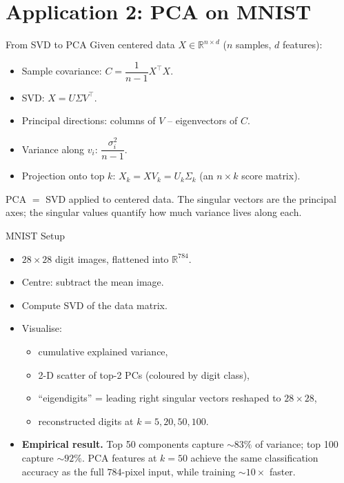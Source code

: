 \documentclass[10pt,aspectratio=169]{beamer}
\newcommand{\R}{\mathbb{R}}
\begin{document}
\section{Application 2: PCA on MNIST}

\begin{frame}{From SVD to PCA}
  Given centered data $X \in \R^{n \times d}$ ($n$ samples, $d$ features):
  \begin{itemize}
    \item Sample covariance: $C = \dfrac{1}{n-1} X^\top X$.
    \item SVD: $X = U \Sigma V^\top$.
    \item Principal directions: columns of $V$ -- eigenvectors of $C$.
    \item Variance along $v_i$: $\dfrac{\sigma_i^2}{n-1}$.
    \item Projection onto top $k$: $X_k = X V_k = U_k \Sigma_k$ (an $n\times k$ score matrix).
  \end{itemize}
  PCA $=$ SVD applied to centered data. The singular vectors are the principal axes; the singular values quantify how much variance lives along each.
\end{frame}

\begin{frame}{MNIST Setup}
  \begin{itemize}
    \item $28 \times 28$ digit images, flattened into $\R^{784}$.
    \item Centre: subtract the mean image.
    \item Compute SVD of the data matrix.
    \item Visualise:
      \begin{itemize}
        \item cumulative explained variance,
        \item 2-D scatter of top-2 PCs (coloured by digit class),
        \item ``eigendigits'' = leading right singular vectors reshaped to $28 \times 28$,
        \item reconstructed digits at $k = 5, 20, 50, 100$.
      \end{itemize}
    \item \textbf{Empirical result.} Top 50 components capture $\sim$$83\%$ of variance; top 100 capture $\sim$$92\%$. PCA features at $k=50$ achieve the same classification accuracy as the full $784$-pixel input, while training $\sim$$10\times$ faster.
  \end{itemize}
\end{frame}
\end{document}
